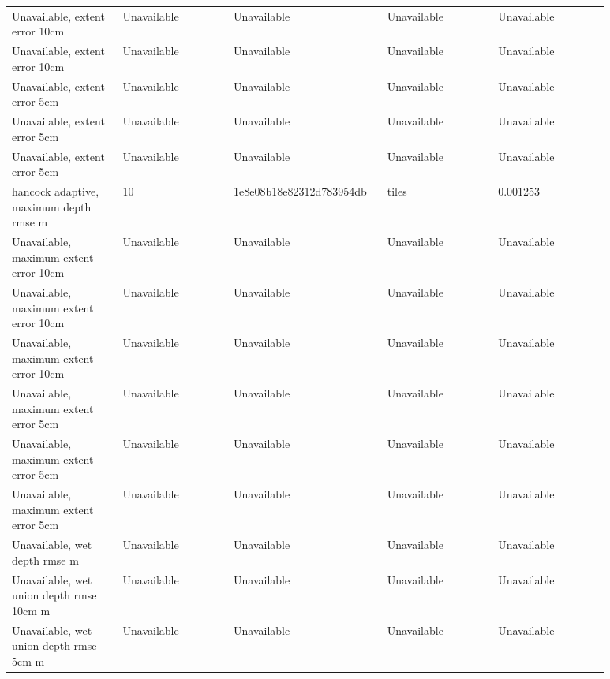 \begin{longtable}{p{0.1760\linewidth}p{0.1760\linewidth}p{0.1760\linewidth}p{0.1760\linewidth}p{0.1760\linewidth}}
Unavailable, extent error 10cm & Unavailable & Unavailable & Unavailable & Unavailable \\
Unavailable, extent error 10cm & Unavailable & Unavailable & Unavailable & Unavailable \\
Unavailable, extent error 5cm & Unavailable & Unavailable & Unavailable & Unavailable \\
Unavailable, extent error 5cm & Unavailable & Unavailable & Unavailable & Unavailable \\
Unavailable, extent error 5cm & Unavailable & Unavailable & Unavailable & Unavailable \\
hancock adaptive, maximum depth rmse m & 10 & 1e8e08b18e82312d783954db & tiles & 0.001253 \\
Unavailable, maximum extent error 10cm & Unavailable & Unavailable & Unavailable & Unavailable \\
Unavailable, maximum extent error 10cm & Unavailable & Unavailable & Unavailable & Unavailable \\
Unavailable, maximum extent error 10cm & Unavailable & Unavailable & Unavailable & Unavailable \\
Unavailable, maximum extent error 5cm & Unavailable & Unavailable & Unavailable & Unavailable \\
Unavailable, maximum extent error 5cm & Unavailable & Unavailable & Unavailable & Unavailable \\
Unavailable, maximum extent error 5cm & Unavailable & Unavailable & Unavailable & Unavailable \\
Unavailable, wet depth rmse m & Unavailable & Unavailable & Unavailable & Unavailable \\
Unavailable, wet union depth rmse 10cm m & Unavailable & Unavailable & Unavailable & Unavailable \\
Unavailable, wet union depth rmse 5cm m & Unavailable & Unavailable & Unavailable & Unavailable \\
\end{longtable}
